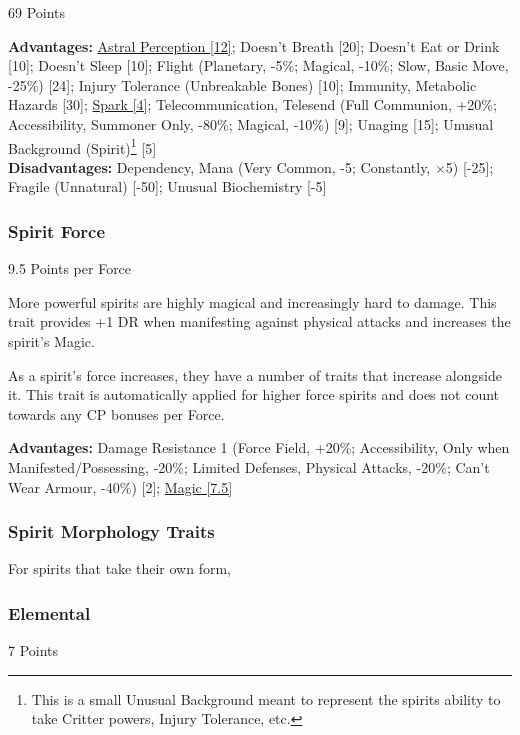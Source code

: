\begin{multicols*}{3}
	\begin{flushright}
		69 Points
	\end{flushright}
	\textbf{Advantages:} 
	\hyperref[astral_perception]{Astral Perception [12]}; Doesn't Breath [20]; Doesn't Eat or Drink [10]; Doesn't Sleep [10]; Flight (Planetary, -5\%; Magical, -10\%; Slow, Basic Move, -25\%) [24]; Injury Tolerance (Unbreakable Bones) [10]; Immunity, Metabolic Hazards [30]; \hyperref[spark]{Spark [4]}; Telecommunication, Telesend (Full Communion, +20\%; Accessibility, Summoner Only, -80\%; Magical, -10\%) [9]; Unaging [15]; Unusual Background (Spirit)\footnote{This is a small Unusual Background meant to represent the spirits ability to take Critter powers, Injury Tolerance, etc.} [5]
	\\\textbf{Disadvantages:} 
	Dependency, Mana (Very Common, -5; Constantly, \(\times\)5) [-25]; Fragile (Unnatural) [-50]; Unusual Biochemistry [-5]
	
	\subsubsection{Spirit Force}\label{spirit_force}
	\begin{flushright}
		9.5 Points per Force
	\end{flushright}
	
	More powerful spirits are highly magical and increasingly hard to damage. This trait provides +1 DR when manifesting against physical attacks and increases the spirit's Magic.
	
	As a spirit's force increases, they have a number of traits that increase alongside it. This trait is automatically applied for higher force spirits and does not count towards any CP bonuses per Force.
	
	\textbf{Advantages:}
	Damage Resistance 1 (Force Field, +20\%; Accessibility, Only when Manifested/Possessing, -20\%; Limited Defenses, Physical Attacks, -20\%; Can't Wear Armour, -40\%) [2]; \hyperref[magic]{Magic [7.5]}
	
	\subsubsection{Spirit Morphology Traits}
	
	For spirits that take their own form, 
	
	\subsubsection*{Elemental}\label{elemental}
	\begin{flushright}
		7 Points
	\end{flushright}
	

\end{multicols*}
